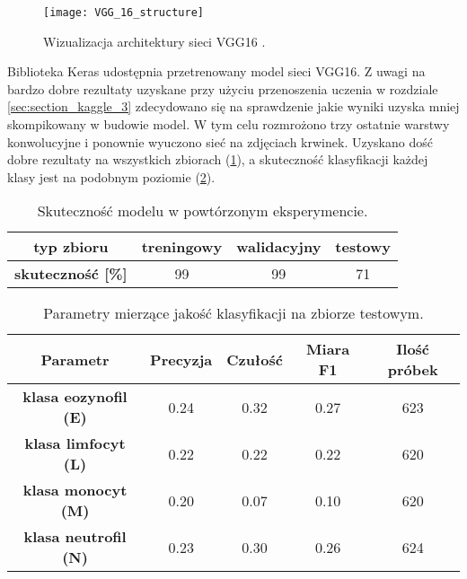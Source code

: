 \begin{figure}[h]
	\centering
	\centering
		\texttt{[image: VGG\_16\_structure]}	
	\caption{Wizualizacja architektury sieci VGG16 \cite{VGG_16_structure}.}
	\label{fig:vgg_16_stucture}
	\label{fig:ann_visualisation}
\end{figure}

{\parindent0pt
Biblioteka Keras udostępnia przetrenowany model sieci VGG16. Z uwagi na bardzo dobre rezultaty uzyskane przy użyciu przenoszenia uczenia w rozdziale \ref{sec:section_kaggle_3} zdecydowano się na sprawdzenie jakie wyniki uzyska mniej skompikowany w budowie model. W tym celu rozmrożono trzy ostatnie warstwy konwolucyjne i ponownie wyuczono sieć na zdjęciach krwinek. Uzyskano dość dobre rezultaty na wszystkich zbiorach (\ref{tab:VGG16_acc}), a skuteczność klasyfikacji każdej klasy jest na podobnym poziomie (\ref{tab:VGG16_params_val}).

 \begin{table}[h!]
\centering
\caption[Short Heading]{Skuteczność modelu w powtórzonym eksperymencie.}
\label{tab:VGG16_acc}
\begin{tabular}{|c|c|c|c|}
\hline
\textbf{typ zbioru}           & \textbf{treningowy} & \textbf{walidacyjny} & \textbf{testowy} \\ \hline
\textbf{skuteczność {[}\%{]}} & 99                  & 99                   & 71               \\ \hline
\end{tabular}
\end{table}

\begin{table}[h!]
\centering
\caption[Short Heading]{Parametry mierzące jakość klasyfikacji na zbiorze testowym.}
\label{tab:VGG16_params_val}
\begin{tabular}{|c|c|c|c|c|}
\hline
\textbf{Parametr}                               & \textbf{Precyzja} & \textbf{Czułość} & \textbf{Miara F1} & \textbf{Ilość próbek} \\ \hline
\textbf{klasa eozynofil (E)} & 0.24   & 0.32   & 0.27 & 623  \\ \hline
\textbf{klasa limfocyt (L)} & 0.22  & 0.22 & 0.22  & 620  \\ \hline
\textbf{klasa monocyt (M)} & 0.20   & 0.07    & 0.10  & 620  \\ \hline
\textbf{klasa neutrofil (N)} & 0.23   & 0.30    & 0.26  & 624  \\ \hline
\end{tabular}
\end{table}

}
